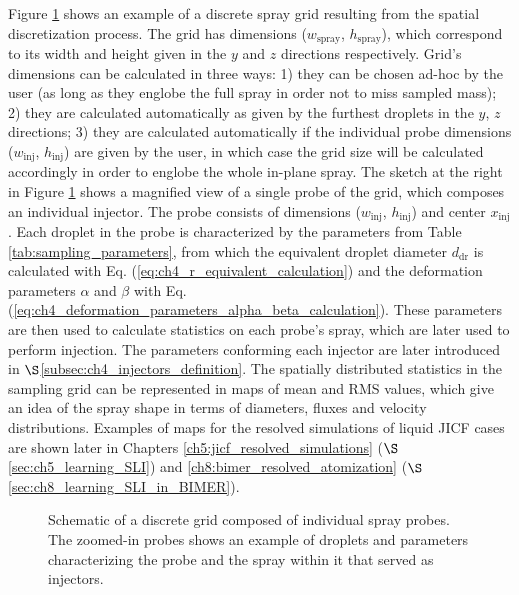 Figure \ref{fig:SLI_discretization} shows an example of a discrete spray grid resulting from the spatial discretization process. The grid has dimensions ($w_\mathrm{spray}$, $h_\mathrm{spray}$), which correspond to its width and height given in the $y$ and $z$ directions respectively. Grid's dimensions can be calculated in three ways: 1) they can be chosen ad-hoc by the user (as long as they englobe the full spray in order not to miss sampled mass); 2) they are calculated automatically as given by the furthest droplets in the $y$, $z$ directions; 3) they are calculated automatically if the individual probe dimensions ($w_\mathrm{inj}$, $h_\mathrm{inj}$) are given by the user, in which case the grid size will be calculated accordingly in order to englobe the whole in-plane spray. The sketch at the right in Figure \ref{fig:SLI_discretization} shows a magnified view of a single probe of the grid, which composes an individual injector. The probe consists of dimensions ($w_\mathrm{inj}$, $h_\mathrm{inj}$) and center $x_\mathrm{inj}$. Each droplet in the probe is characterized by the parameters from Table \ref{tab:sampling_parameters}, from which the equivalent droplet diameter $d_\mathrm{dr}$ is calculated with Eq. (\ref{eq:ch4_r_equivalent_calculation}) and the deformation parameters $\alpha$ and $\beta$ with Eq. (\ref{eq:ch4_deformation_parameters_alpha_beta_calculation}). These parameters are then used to calculate statistics on each probe's spray, which are later used to perform injection. The parameters conforming each injector are later introduced in $\S$\ref{subsec:ch4_injectors_definition}. The spatially distributed statistics in the sampling grid can be represented in maps of mean and RMS values, which give an idea of the spray shape in terms of diameters, fluxes and velocity distributions. Examples of maps for the resolved simulations of liquid JICF cases are shown later in Chapters \ref{ch5:jicf_resolved_simulations} ($\S$\ref{sec:ch5_learning_SLI}) and \ref{ch8:bimer_resolved_atomization} ($\S$\ref{sec:ch8_learning_SLI_in_BIMER}).

\clearpage

\begin{figure}[h!]	
	\centering
	\caption{Schematic of a discrete grid composed of individual spray probes. The zoomed-in probes shows an example of droplets and parameters characterizing the probe and the spray within it that served as injectors.}
	\label{fig:SLI_discretization}
\end{figure}


